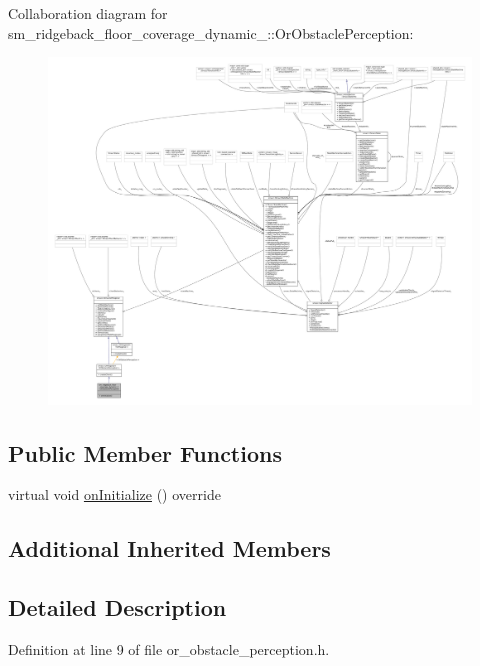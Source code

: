 Collaboration diagram for sm\+\_\+ridgeback\+\_\+floor\+\_\+coverage\+\_\+dynamic\+\_\+:\+:Or\+Obstacle\+Perception\+:
\nopagebreak
\begin{figure}[H]
\begin{center}
\leavevmode
\includegraphics[width=350pt]{classsm__ridgeback__floor__coverage__dynamic__1_1_1OrObstaclePerception__coll__graph}
\end{center}
\end{figure}
\subsection*{Public Member Functions}
\begin{DoxyCompactItemize}
\item 
virtual void \hyperlink{classsm__ridgeback__floor__coverage__dynamic__1_1_1OrObstaclePerception_a689e4709ac00f184357cd490f8cd3b69}{on\+Initialize} () override
\end{DoxyCompactItemize}
\subsection*{Additional Inherited Members}


\subsection{Detailed Description}


Definition at line 9 of file or\+\_\+obstacle\+\_\+perception.\+h.



